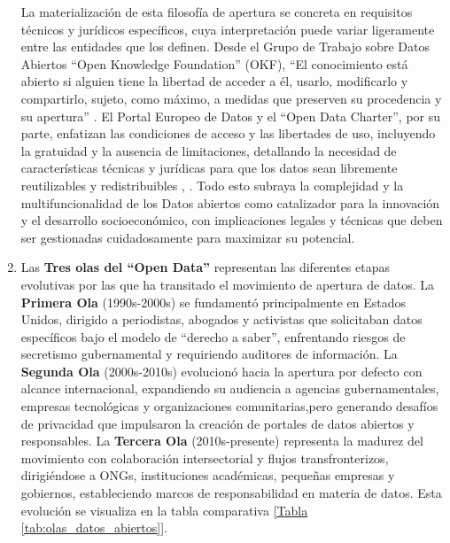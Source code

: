 \begin{enumerate}
	La materialización de esta filosofía de apertura se concreta en requisitos técnicos y jurídicos específicos, cuya interpretación puede variar ligeramente entre las entidades que los definen. Desde el Grupo de Trabajo sobre Datos Abiertos ``Open Knowledge Foundation'' (OKF), “El conocimiento está abierto si alguien tiene la libertad de acceder a él, usarlo, modificarlo y compartirlo, sujeto, como máximo, a medidas que preserven su procedencia y su apertura” \citep{OpenKnowledgeFoundation}. El Portal Europeo de Datos y el ``Open Data Charter'', por su parte, enfatizan las condiciones de acceso y las libertades de uso, incluyendo la gratuidad y la ausencia de limitaciones, detallando la necesidad de características técnicas y jurídicas para que los datos sean libremente reutilizables y redistribuibles \citep{dataEuropaOpenData}, \citep{Open_Data_Charter}.
	Todo esto subraya la complejidad y la multifuncionalidad de los Datos abiertos como catalizador para la innovación y el desarrollo socioeconómico, con implicaciones legales y técnicas que deben ser gestionadas cuidadosamente para maximizar su potencial. \\
	
	\item Las \textbf{Tres olas del ``Open Data'' } \label{def5} representan las diferentes etapas evolutivas por las que ha transitado el movimiento de apertura de datos. 
	La \textbf{Primera Ola} (1990s-2000s) se fundamentó principalmente en Estados Unidos, dirigido a periodistas, abogados y activistas que solicitaban datos específicos bajo el modelo de ``derecho a saber'', enfrentando riesgos de secretismo gubernamental y requiriendo auditores de información. 
	La \textbf{Segunda Ola} (2000s-2010s) evolucionó hacia la apertura por defecto con alcance internacional, expandiendo su audiencia a agencias gubernamentales, empresas tecnológicas y organizaciones comunitarias,pero generando desafíos de privacidad que impulsaron la creación de portales de datos abiertos y responsables.
	La \textbf{Tercera Ola} (2010s-presente) representa la madurez del movimiento  con colaboración intersectorial y flujos transfronterizos, dirigiéndose a ONGs, instituciones académicas, pequeñas empresas y gobiernos, estableciendo marcos de responsabilidad en materia de datos. 
	Esta evolución se visualiza en la tabla comparativa \hyperref[tab:olas_datos_abiertos]{[Tabla \ref*{tab:olas_datos_abiertos}]}. \\
	

\end{enumerate}
